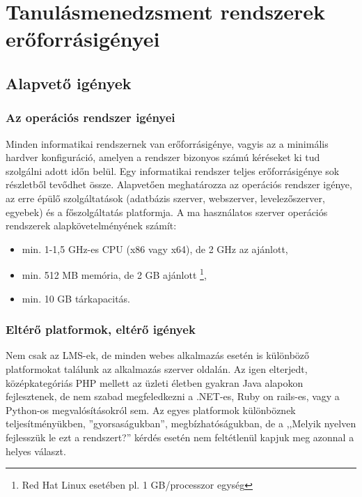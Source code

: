 \chapter{Tanulásmenedzsment rendszerek erőforrásigényei}
\section{Alapvető igények}
\subsection{Az operációs rendszer igényei}
Minden informatikai rendszernek van erőforrásigénye, vagyis az a minimális hardver konfiguráció, amelyen a rendszer bizonyos számú kéréseket ki tud szolgálni adott időn belül. 
Egy informatikai rendszer teljes erőforrásigénye sok részletből tevődhet össze. Alapvetően meghatározza az operációs rendszer igénye, az erre épülő szolgáltatások (adatbázis szerver, webszerver, levelezőszerver, egyebek) és a főszolgáltatás platformja.
A ma használatos szerver operációs rendszerek alapkövetelményének számít:


\begin{itemize}
\item min. 1-1,5 GHz-es CPU (x86 vagy x64), de 2 GHz az ajánlott,
\item min. 512 MB memória, de 2 GB ajánlott \footnote{Red Hat Linux esetében pl. 1 GB/processzor egység},
\item min. 10 GB tárkapacitás.
\end{itemize}

\subsection{Eltérő platformok, eltérő igények}
Nem csak az LMS-ek, de minden webes alkalmazás esetén is különböző platformokat találunk az alkalmazás szerver oldalán. Az igen elterjedt, középkategóriás PHP mellett az üzleti életben gyakran Java alapokon fejlesztenek, de nem szabad megfeledkezni a .NET-es, Ruby on rails-es, vagy a Python-os megvalósításokról sem.
Az egyes platformok különböznek teljesítményükben, ''gyorsaságukban'', megbízhatóságukban, de a ,,Melyik nyelven fejlesszük le ezt a rendszert?'' kérdés esetén nem feltétlenül kapjuk meg azonnal a helyes választ.

